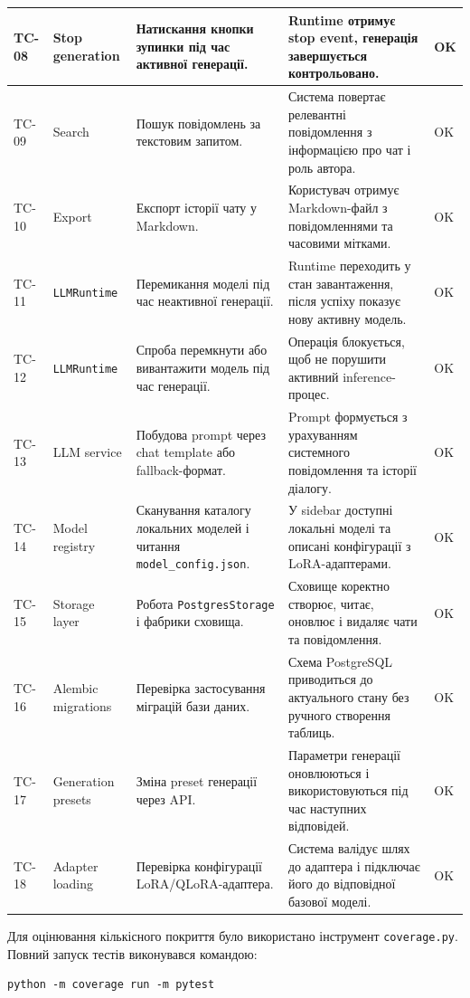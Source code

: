 \begin{longtable}{|p{1.2cm}|p{2.7cm}|p{4.2cm}|p{3.9cm}|p{1.3cm}|}
TC-08 & Stop generation & Натискання кнопки зупинки під час активної генерації. & Runtime отримує stop event, генерація завершується контрольовано. & OK \\
\hline
TC-09 & Search & Пошук повідомлень за текстовим запитом. & Система повертає релевантні повідомлення з інформацією про чат і роль автора. & OK \\
\hline
TC-10 & Export & Експорт історії чату у Markdown. & Користувач отримує Markdown-файл з повідомленнями та часовими мітками. & OK \\
\hline
TC-11 & \texttt{LLMRuntime} & Перемикання моделі під час неактивної генерації. & Runtime переходить у стан завантаження, після успіху показує нову активну модель. & OK \\
\hline
TC-12 & \texttt{LLMRuntime} & Спроба перемкнути або вивантажити модель під час генерації. & Операція блокується, щоб не порушити активний inference-процес. & OK \\
\hline
TC-13 & LLM service & Побудова prompt через chat template або fallback-формат. & Prompt формується з урахуванням системного повідомлення та історії діалогу. & OK \\
\hline
TC-14 & Model registry & Сканування каталогу локальних моделей і читання \texttt{model\_config.json}. & У sidebar доступні локальні моделі та описані конфігурації з LoRA-адаптерами. & OK \\
\hline
TC-15 & Storage layer & Робота \texttt{PostgresStorage} і фабрики сховища. & Сховище коректно створює, читає, оновлює і видаляє чати та повідомлення. & OK \\
\hline
TC-16 & Alembic migrations & Перевірка застосування міграцій бази даних. & Схема PostgreSQL приводиться до актуального стану без ручного створення таблиць. & OK \\
\hline
TC-17 & Generation presets & Зміна preset генерації через API. & Параметри генерації оновлюються і використовуються під час наступних відповідей. & OK \\
\hline
TC-18 & Adapter loading & Перевірка конфігурації LoRA/QLoRA-адаптера. & Система валідує шлях до адаптера і підключає його до відповідної базової моделі. & OK \\
\hline
\end{longtable}
\normalsize

Для оцінювання кількісного покриття було використано інструмент \texttt{coverage.py}. Повний запуск тестів виконувався командою:

\begin{lstlisting}[style=plantumlstyle]
python -m coverage run -m pytest
\end{lstlisting}

